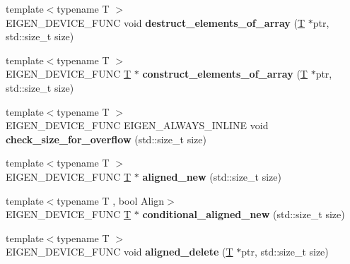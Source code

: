 \begin{DoxyCompactItemize}
{\footnotesize template$<$typename T $>$ }\\E\+I\+G\+E\+N\+\_\+\+D\+E\+V\+I\+C\+E\+\_\+\+F\+U\+NC void {\bfseries destruct\+\_\+elements\+\_\+of\+\_\+array} (\hyperlink{group___sparse_core___module}{T} $\ast$ptr, std\+::size\+\_\+t size)
\item 
\mbox{\label{namespace_eigen_1_1internal_acfef653c7a80b5d49047e85ff19ac2b6}} 
{\footnotesize template$<$typename T $>$ }\\E\+I\+G\+E\+N\+\_\+\+D\+E\+V\+I\+C\+E\+\_\+\+F\+U\+NC \hyperlink{group___sparse_core___module}{T} $\ast$ {\bfseries construct\+\_\+elements\+\_\+of\+\_\+array} (\hyperlink{group___sparse_core___module}{T} $\ast$ptr, std\+::size\+\_\+t size)
\item 
\mbox{\label{namespace_eigen_1_1internal_ab9cbaa75a3a4be427063623e8f390085}} 
{\footnotesize template$<$typename T $>$ }\\E\+I\+G\+E\+N\+\_\+\+D\+E\+V\+I\+C\+E\+\_\+\+F\+U\+NC E\+I\+G\+E\+N\+\_\+\+A\+L\+W\+A\+Y\+S\+\_\+\+I\+N\+L\+I\+NE void {\bfseries check\+\_\+size\+\_\+for\+\_\+overflow} (std\+::size\+\_\+t size)
\item 
\mbox{\label{namespace_eigen_1_1internal_a67fee538128f7d7ccd1dac4cc84dc089}} 
{\footnotesize template$<$typename T $>$ }\\E\+I\+G\+E\+N\+\_\+\+D\+E\+V\+I\+C\+E\+\_\+\+F\+U\+NC \hyperlink{group___sparse_core___module}{T} $\ast$ {\bfseries aligned\+\_\+new} (std\+::size\+\_\+t size)
\item 
\mbox{\label{namespace_eigen_1_1internal_a8eb310e5e6834f1f931df593bb9ee26e}} 
{\footnotesize template$<$typename T , bool Align$>$ }\\E\+I\+G\+E\+N\+\_\+\+D\+E\+V\+I\+C\+E\+\_\+\+F\+U\+NC \hyperlink{group___sparse_core___module}{T} $\ast$ {\bfseries conditional\+\_\+aligned\+\_\+new} (std\+::size\+\_\+t size)
\item 
\mbox{\label{namespace_eigen_1_1internal_a0a7685afbcd966504733314551bb1c0f}} 
{\footnotesize template$<$typename T $>$ }\\E\+I\+G\+E\+N\+\_\+\+D\+E\+V\+I\+C\+E\+\_\+\+F\+U\+NC void {\bfseries aligned\+\_\+delete} (\hyperlink{group___sparse_core___module}{T} $\ast$ptr, std\+::size\+\_\+t size)

\end{DoxyCompactItemize}
